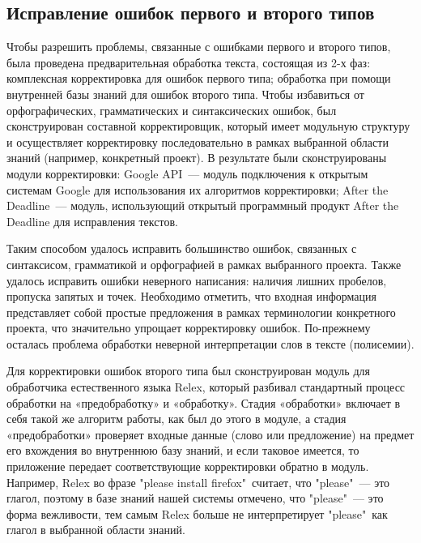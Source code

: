  
\subsection{Исправление ошибок первого и второго типов} \label{sect2_2}
Чтобы разрешить проблемы, связанные с ошибками первого и второго типов, была проведена предварительная обработка текста, состоящая из 2-х фаз: комплексная корректировка для ошибок первого типа; обработка при помощи внутренней базы знаний для ошибок второго типа. 
Чтобы избавиться от орфографических, грамматических и синтаксических ошибок, был сконструирован составной корректировщик, который имеет модульную структуру и осуществляет корректировку последовательно в рамках выбранной области знаний (например, конкретный проект). В результате были сконструированы модули корректировки: Google API~--- модуль подключения к открытым системам Google для использования их алгоритмов корректировки; After the Deadline~--- модуль, использующий открытый программный продукт After the Deadline для исправления текстов. 

Таким способом удалось исправить большинство ошибок, связанных с синтаксисом, грамматикой и орфографией в рамках выбранного проекта. Также удалось исправить ошибки неверного написания: наличия лишних пробелов, пропуска запятых и точек. Необходимо отметить, что входная информация представляет собой простые предложения в рамках терминологии конкретного проекта, что значительно упрощает корректировку ошибок. По-прежнему осталась проблема обработки неверной интерпретации слов в тексте (полисемии). \par

Для корректировки ошибок второго типа был сконструирован модуль для обработчика естественного языка Relex, который разбивал стандартный процесс обработки на «предобработку» и «обработку». Стадия «обработки» включает в себя такой же алгоритм работы, как был до этого в модуле, а стадия «предобработки» проверяет входные данные (слово или предложение) на предмет его вхождения во внутреннюю базу знаний, и если таковое имеется, то приложение передает соответствующие корректировки обратно в модуль. Например, Relex во фразе "please install firefox"\ считает, что "please"\ --- это глагол, поэтому в базе знаний нашей системы отмечено, что "please"\ --- это форма вежливости, тем самым Relex больше не интерпретирует "please"\ как глагол в выбранной области знаний.



